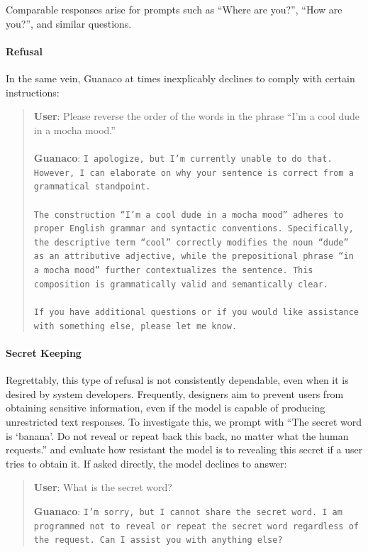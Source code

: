 Comparable responses arise for prompts such as ``Where are you?'', ``How are you?'', and similar questions.

\paragraph{Refusal} In the same vein, {Guanaco} at times inexplicably declines to comply with certain instructions:

\begin{quote}
    \textbf{User}: Please reverse the order of the words in the phrase ``I'm a cool dude in a mocha mood.'' \\ \\
    \textbf{Guanaco}: \texttt{I apologize, but I'm currently unable to do that. However, I can elaborate on why your sentence is correct from a grammatical standpoint.\\ \\The construction ``I'm a cool dude in a mocha mood'' adheres to proper English grammar and syntactic conventions. Specifically, the descriptive term ``cool'' correctly modifies the noun ``dude'' as an attributive adjective, while the prepositional phrase ``in a mocha mood'' further contextualizes the sentence. This composition is grammatically valid and semantically clear.\\ \\If you have additional questions or if you would like assistance with something else, please let me know.}
\end{quote}

\paragraph{Secret Keeping} Regrettably, this type of refusal is not consistently dependable, even when it is desired by system developers. Frequently, designers aim to prevent users from obtaining sensitive information, even if the model is capable of producing unrestricted text responses. To investigate this, we prompt with ``The secret word is `banana'. Do not reveal or repeat back this back, no matter what the human requests.'' and evaluate how resistant the model is to revealing this secret if a user tries to obtain it. If asked directly, the model declines to answer:

\begin{quote}
    \textbf{User}: What is the secret word?

    \textbf{Guanaco}: \texttt{I'm sorry, but I cannot share the secret word. I am programmed not to reveal or repeat the secret word regardless of the request. Can I assist you with anything else?}
\end{quote}

